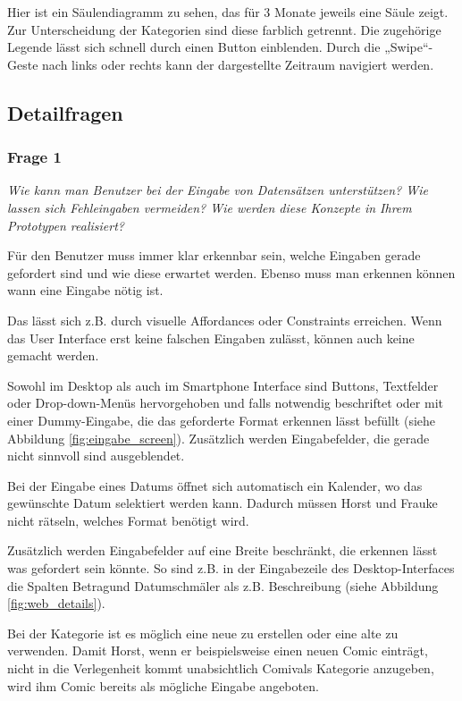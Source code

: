 Hier ist ein S\"aulendiagramm zu sehen, das für 3 Monate jeweils eine S\"aule zeigt. Zur Unterscheidung der Kategorien sind diese farblich getrennt. Die zugeh\"orige Legende lässt sich schnell durch einen Button einblenden. Durch die „Swipe“-Geste nach links oder rechts kann der dargestellte Zeitraum navigiert werden.

\newpage
\subsection{Detailfragen}

\subsubsection{Frage 1}

\emph{Wie kann man Benutzer bei der Eingabe von Datensätzen unterstützen? Wie lassen sich Fehleingaben vermeiden? Wie werden diese Konzepte in Ihrem Prototypen realisiert?}

\vspace{2mm}

F\"ur den Benutzer muss immer klar erkennbar sein, welche Eingaben gerade
gefordert sind und wie diese erwartet werden. Ebenso muss man erkennen
k\"onnen wann eine Eingabe n\"otig ist.

Das l\"asst sich z.B. durch visuelle Affordances oder Constraints
erreichen. Wenn das User Interface erst keine falschen Eingaben zul\"asst,
k\"onnen auch keine gemacht werden.

Sowohl im Desktop als auch im Smartphone Interface sind Buttons, Textfelder
oder Drop-down-Men\"us hervorgehoben und falls notwendig beschriftet oder
mit einer Dummy-Eingabe, die das geforderte Format erkennen
l\"asst bef\"ullt (siehe Abbildung \ref{fig:eingabe_screen}). Zus\"atzlich
werden Eingabefelder, die gerade nicht sinnvoll sind ausgeblendet.

Bei der Eingabe eines Datums \"offnet sich automatisch ein Kalender, wo das
gew\"unschte Datum selektiert werden kann. Dadurch m\"ussen Horst und
Frauke nicht r\"atseln, welches Format ben\"otigt wird.

Zus\"atzlich werden Eingabefelder auf eine Breite beschr\"ankt, die
erkennen l\"asst was gefordert sein k\"onnte. So sind z.B. in der
Eingabezeile des Desktop-Interfaces die Spalten \glqq Betrag\grqq\space und
\glqq Datum\grqq\space schm\"aler als z.B. \glqq Beschreibung\grqq\space
(siehe Abbildung \ref{fig:web_details}).

Bei der Kategorie ist es m\"oglich eine neue zu erstellen oder eine alte zu
verwenden. Damit Horst, wenn er beispielsweise einen neuen Comic
eintr\"agt, nicht in die Verlegenheit kommt unabsichtlich
\glqq Comiv\grqq\space als Kategorie anzugeben, wird ihm \glqq Comic\grqq\space
bereits als m\"ogliche Eingabe angeboten.



